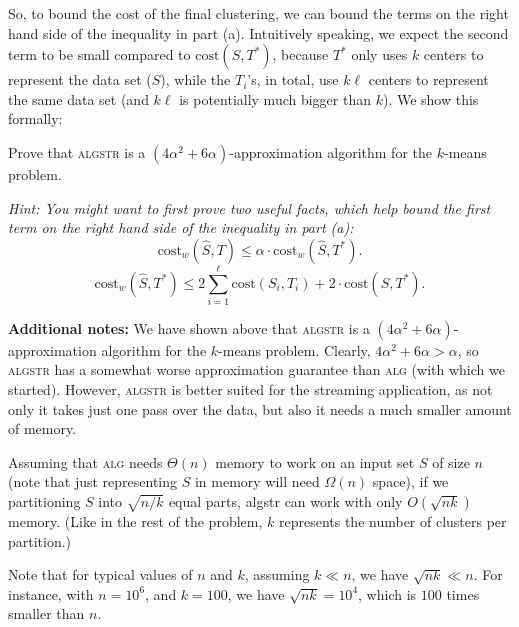 

 So, to bound the cost of the final clustering, we can
bound the terms on the right hand side of the inequality in part (a).
Intuitively speaking, we expect the second term to be small compared to
$\mathrm{cost}(S,T^{*})$, because $T^{*}$ only uses $k$ centers to represent the
data set ($S$), while the $T_i$'s, in total, use $k\ell$ centers to represent
the same data set (and $k\ell$ is potentially much bigger than $k$). We show this formally:



 Prove that \textsc{algstr} is a $(4\alpha^2+6\alpha)$-approximation algorithm for the $k$-means problem.


\textit{Hint: You might want to first prove two useful facts, which help bound the first term on the right hand side of the inequality in part (a):}
\[{\mathrm{cost}_w(\widehat{S}, T) \leq \alpha \cdot \mathrm{cost}_w(\widehat{S},T^{*})}.\]
\[{\mathrm{cost}_w(\widehat{S},
T^{*}) \leq 2\sum_{i=1}^{\ell} \mathrm{cost}(S_i, T_i) + 2\cdot \mathrm{cost}(S,T^{*})}.\]


\textbf{Additional notes:} We have shown above that \textsc{algstr} is a $(4\alpha^2+6\alpha)$-approximation algorithm for the $k$-means problem. Clearly, $4\alpha^2+6\alpha > \alpha$, so \textsc{algstr} has a somewhat worse approximation guarantee than \textsc{alg} (with which we started).  However, \textsc{algstr} is better suited for the streaming application, as not only it takes just one pass over the data, but also it needs a much smaller amount of memory.

Assuming that \textsc{alg} needs $\Theta(n)$ memory to work on an input set $S$ of size $n$  (note that just representing $S$ in memory will need $\Omega(n)$ space), if we partitioning $S$ into $\sqrt{n/k}$ equal parts, {\sc algstr} can work with only ${O(\sqrt{nk})}$ memory. (Like in the rest of the problem, $k$ represents the number of clusters per partition.)

Note that for typical values of $n$ and $k$, assuming $k \ll n$, we have $\sqrt{nk} \ll n$. For instance, with $n=10^6$, and $k=100$, we have $\sqrt{nk} = 10^4$, which is $100$ times smaller than $n$.

